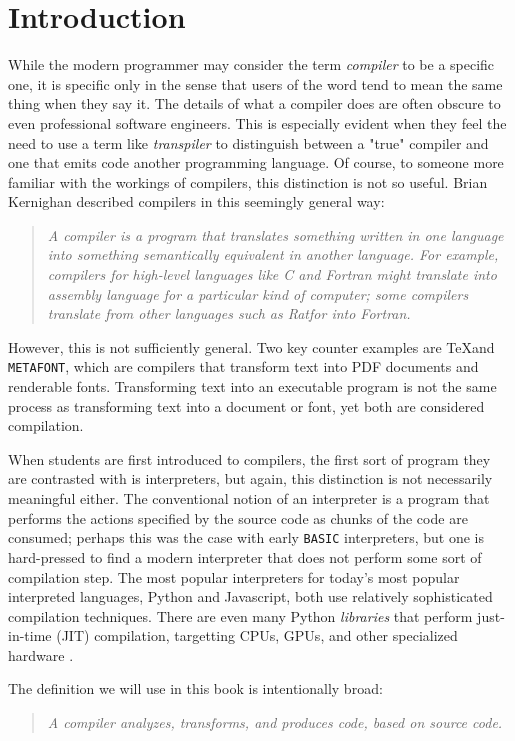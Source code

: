 \chapter{Introduction}

While the modern programmer may consider the term \emph{compiler} to be a specific one, it is specific only in the
sense that users of the word tend to mean the same thing when they say it.
The details of what a compiler does are often obscure to even professional software engineers.
This is especially evident when they feel the need to use a term like \emph{transpiler} to distinguish between a
"true" compiler and one that emits code another programming language.
Of course, to someone more familiar with the workings of compilers, this distinction is not so useful.
Brian Kernighan described compilers in this seemingly general way\cite{new_history_of_modern_computing}:

\begin{quotation}
\textit{
A compiler is a program that translates something written in one language into something semantically equivalent in another language.
For example, compilers for high-level languages like C and Fortran might translate into assembly language for a particular kind of computer; some compilers translate from other languages such as Ratfor into Fortran.
}
\end{quotation}

However, this is not sufficiently general.
Two key counter examples are \TeX and \texttt{METAFONT}, which are compilers that
transform text into PDF documents and renderable fonts.
Transforming text into an executable program is not the same process as
transforming text into a document or font, yet both are considered compilation.

When students are first introduced to compilers, the first sort of program they are contrasted with is interpreters,
but again, this distinction is not necessarily meaningful either.
The conventional notion of an interpreter is a program that performs the actions
specified by the source code as chunks of the code are consumed;
perhaps this was the case with early \texttt{BASIC} interpreters, but one is hard-pressed
to find a modern interpreter that does not perform some sort of compilation step.
The most popular interpreters for today's most popular interpreted languages,
Python and Javascript, both use relatively sophisticated compilation techniques.
There are even many Python \textit{libraries} that perform
just-in-time (JIT) compilation, targetting CPUs, GPUs, and other specialized hardware
\cite{jax-compiler}\cite{lam_numba}\cite{numba_cuda}\cite{triton_tillet}.

\vspace{0.5em}

The definition we will use in this book is intentionally broad:
\begin{quotation}
\textit{
    A compiler analyzes, transforms, and produces code, based on source code.
}
\end{quotation}
